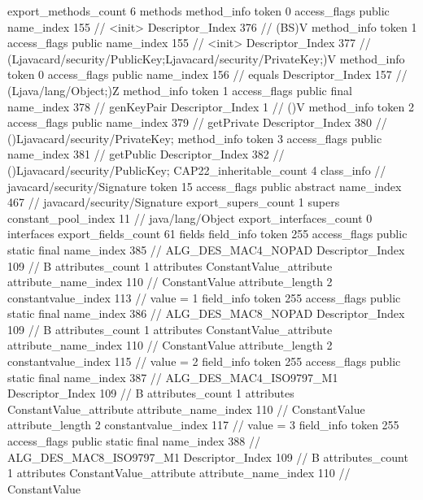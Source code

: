 {{{{{{{				}
				}
			}
			}
			export_methods_count	6
			methods {
				method_info {
					token	0
					access_flags	public
					name_index	155		// <init>
					Descriptor_Index	376		// (BS)V
				}
				method_info {
					token	1
					access_flags	public
					name_index	155		// <init>
					Descriptor_Index	377		// (Ljavacard/security/PublicKey;Ljavacard/security/PrivateKey;)V
				}
				method_info {
					token	0
					access_flags	public
					name_index	156		// equals
					Descriptor_Index	157		// (Ljava/lang/Object;)Z
				}
				method_info {
					token	1
					access_flags	public final
					name_index	378		// genKeyPair
					Descriptor_Index	1		// ()V
				}
				method_info {
					token	2
					access_flags	public
					name_index	379		// getPrivate
					Descriptor_Index	380		// ()Ljavacard/security/PrivateKey;
				}
				method_info {
					token	3
					access_flags	public
					name_index	381		// getPublic
					Descriptor_Index	382		// ()Ljavacard/security/PublicKey;
				}
			}
			CAP22_inheritable_count	4
		}
		class_info {		// javacard/security/Signature
			token	15
			access_flags	public abstract
			name_index	467		// javacard/security/Signature
			export_supers_count	1
			supers {
				constant_pool_index	11		// java/lang/Object
			}
			export_interfaces_count	0
			interfaces {
			}
			export_fields_count	61
			fields {
			field_info {
				token	255
				access_flags	public static final
				name_index	385		// ALG_DES_MAC4_NOPAD
				Descriptor_Index	109		// B
				attributes_count	1
				attributes {
				ConstantValue_attribute {
					attribute_name_index	110		// ConstantValue
					attribute_length	2
					constantvalue_index	113		// value = 1
				}
				}
			}
			field_info {
				token	255
				access_flags	public static final
				name_index	386		// ALG_DES_MAC8_NOPAD
				Descriptor_Index	109		// B
				attributes_count	1
				attributes {
				ConstantValue_attribute {
					attribute_name_index	110		// ConstantValue
					attribute_length	2
					constantvalue_index	115		// value = 2
				}
				}
			}
			field_info {
				token	255
				access_flags	public static final
				name_index	387		// ALG_DES_MAC4_ISO9797_M1
				Descriptor_Index	109		// B
				attributes_count	1
				attributes {
				ConstantValue_attribute {
					attribute_name_index	110		// ConstantValue
					attribute_length	2
					constantvalue_index	117		// value = 3
				}
				}
			}
			field_info {
				token	255
				access_flags	public static final
				name_index	388		// ALG_DES_MAC8_ISO9797_M1
				Descriptor_Index	109		// B
				attributes_count	1
				attributes {
				ConstantValue_attribute {
					attribute_name_index	110		// ConstantValue
}}}}}}}
